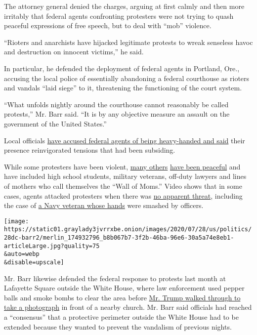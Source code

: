 The attorney general denied the charges, arguing at first calmly and
then more irritably that federal agents confronting protesters were not
trying to quash peaceful expressions of free speech, but to deal with
``mob'' violence.

``Rioters and anarchists have hijacked legitimate protests to wreak
senseless havoc and destruction on innocent victims,'' he said.

In particular, he defended the deployment of federal agents in Portland,
Ore., accusing the local police of essentially abandoning a federal
courthouse as rioters and vandals ``laid siege'' to it, threatening the
functioning of the court system.

``What unfolds nightly around the courthouse cannot reasonably be called
protests,'' Mr. Barr said. ``It is by any objective measure an assault
on the government of the United States.''

Local officials
\href{https://www.nytimes3xbfgragh.onion/article/portland-protests-explained-protesters.html}{have
accused federal agents of being heavy-handed and said} their presence
reinvigorated tensions that had been subsiding.

While some protesters have been violent,
\href{https://www.nytimes3xbfgragh.onion/2020/07/19/us/portland-protests.html}{many
others}
\href{https://www.nytimes3xbfgragh.onion/2020/07/27/us/protests-divisions-blm.html}{have
been peaceful} and have included high school students, military
veterans, off-duty lawyers and lines of mothers who call themselves the
``Wall of Moms.'' Video shows that in some cases, agents attacked
protesters when there was
\href{https://www.nytimes3xbfgragh.onion/video/us/100000007243995/portland-protests-federal-government.html?action=click\&gtype=vhs\&version=vhs-heading\&module=vhs\&region=title-area\&cview=true\&t=4}{no
apparent threat}, including the case of
\href{https://www.nytimes3xbfgragh.onion/2020/07/20/us/portland-protests-navy-christopher-david.html}{a
Navy veteran whose hands} were smashed by officers.

\texttt{[image: https://static01.graylady3jvrrxbe.onion/images/2020/07/28/us/politics/28dc-barr2/merlin\_174932796\_b8b067b7-3f2b-46ba-96e6-30a5a74e8eb1-articleLarge.jpg?quality=75\\\&auto=webp\\\&disable=upscale]}

Mr. Barr likewise defended the federal response to protests last month
at Lafayette Square outside the White House, where law enforcement used
pepper balls and smoke bombs to clear the area before
\href{https://www.nytimes3xbfgragh.onion/2020/06/02/us/politics/trump-walk-lafayette-square.html}{Mr.
Trump walked through to take a photograph} in front of a nearby church.
Mr. Barr said officials had reached a ``consensus'' that a protective
perimeter outside the White House had to be extended because they wanted
to prevent the vandalism of previous nights.


